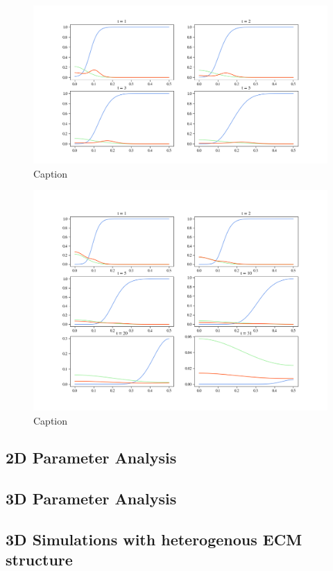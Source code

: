\begin{figure}
    \centering
    \includegraphics[width=\textwidth]{resources/images/0.001_0.001_0.001_10_0.1_0_0.005_0_0.png}
    \caption{Caption}
    \label{fig:gliederung}
\end{figure}
\begin{figure}
    \centering
    \includegraphics[width=\textwidth]{resources/images/0.001_0.001_0.001_20_0.1_0_0.002_0_0.png}
    \caption{Caption}
    \label{fig:gliederung}
\end{figure}
\subsection{2D Parameter Analysis}
\subsection{3D Parameter Analysis}
\subsection{3D Simulations with heterogenous ECM structure}